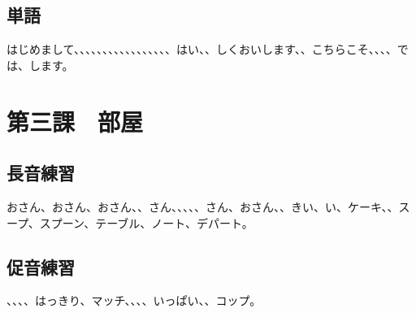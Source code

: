 \documentclass[a5j]{ltjtarticle}
\begin{document}
\subsection*{単語}

\begin{onehalfspace}
  はじめまして、、、、、、、、、、、、、、、、、はい、、しくおいします、、こちらこそ、、、、では、します。
\end{onehalfspace}

\section*{第三課　部屋}

\subsection*{長音練習}

\begin{onehalfspace}
  おさん、おさん、おさん、、さん、、、、、さん、おさん、、きい、い、ケーキ、、スープ、スプーン、テーブル、ノート、デパート。
\end{onehalfspace}

\subsection*{促音練習}

\begin{onehalfspace}
  、、、、はっきり、マッチ、、、、いっぱい、、コップ。
\end{onehalfspace}
\end{document}
